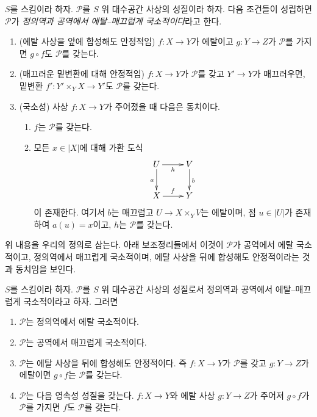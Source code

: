 \begin{definition}
\label{definition-etale-smooth-local-source-target}
$S$를 스킴이라 하자. $\mathcal{P}$를 $S$ 위 대수공간 사상의 성질이라
하자. 다음 조건들이 성립하면 $\mathcal{P}$가 {\it 정의역과 공역에서
에탈--매끄럽게 국소적이다}라고 한다.
\begin{enumerate}
\item (에탈 사상을 앞에 합성해도 안정적임)
$f:X\to Y$가 에탈이고 $g:Y\to Z$가 $\mathcal{P}$를 가지면
$g\circ f$도 $\mathcal{P}$를 갖는다.
\item (매끄러운 밑변환에 대해 안정적임)
$f:X\to Y$가 $\mathcal{P}$를 갖고 $Y'\to Y$가 매끄러우면, 밑변환
$f':Y'\times_YX\to Y'$도 $\mathcal{P}$를 갖는다.
\item (국소성) 사상 $f:X\to Y$가 주어졌을 때 다음은 동치이다.
\begin{enumerate}
\item $f$는 $\mathcal{P}$를 갖는다.
\item 모든 $x\in|X|$에 대해 가환 도식
$$
\xymatrix{
U \ar[d]_a \ar[r]_h & V \ar[d]^b \\
X \ar[r]^f & Y
}
$$
이 존재한다. 여기서 $b$는 매끄럽고 $U\to X\times_YV$는 에탈이며,
점 $u\in|U|$가 존재하여 $a(u)=x$이고, $h$는 $\mathcal{P}$를 갖는다.
\end{enumerate}
\end{enumerate}
\end{definition}

\noindent
위 내용을 우리의 정의로 삼는다. 아래 보조정리들에서 이것이
$\mathcal{P}$가 공역에서 에탈 국소적이고, 정의역에서 매끄럽게
국소적이며, 에탈 사상을 뒤에 합성해도 안정적이라는 것과 동치임을 보인다.

\begin{lemma}
\label{lemma-etale-smooth-local-source-target-implies}
$S$를 스킴이라 하자. $\mathcal{P}$를 $S$ 위 대수공간 사상의 성질로서
정의역과 공역에서 에탈--매끄럽게 국소적이라고 하자. 그러면
\begin{enumerate}
\item $\mathcal{P}$는 정의역에서 에탈 국소적이다.
\item $\mathcal{P}$는 공역에서 매끄럽게 국소적이다.
\item $\mathcal{P}$는 에탈 사상을 뒤에 합성해도 안정적이다. 즉
$f:X\to Y$가 $\mathcal{P}$를 갖고 $g:Y\to Z$가 에탈이면
$g\circ f$는 $\mathcal{P}$를 갖는다.
\item $\mathcal{P}$는 다음 영속성 성질을 갖는다. $f:X\to Y$와 에탈
사상 $g:Y\to Z$가 주어져 $g\circ f$가 $\mathcal{P}$를 가지면 $f$도
$\mathcal{P}$를 갖는다.
\end{enumerate}
\end{lemma}

